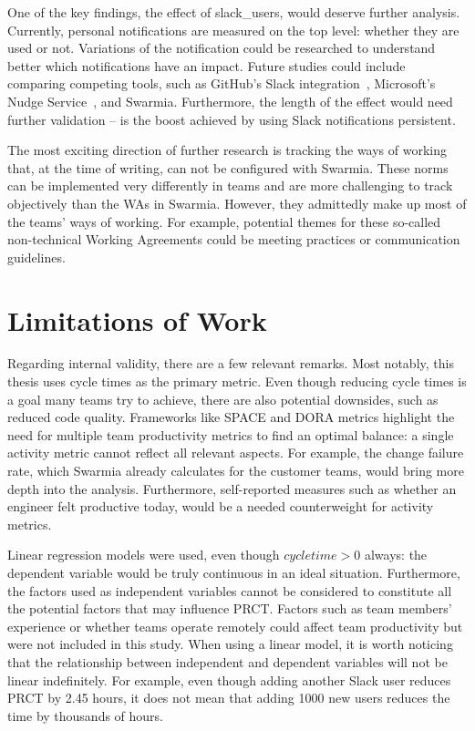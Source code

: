 One of the key findings, the effect of slack\_users, would deserve further analysis. Currently, personal notifications are measured on the top level: whether they are used or not. Variations of the notification could be researched to understand better which notifications have an impact. Future studies could include comparing competing tools, such as GitHub's Slack integration~\cite{slack_technologies_integrationsslack_2022}, Microsoft's Nudge Service~\cite{maddila_nudge_2022}, and Swarmia. Furthermore, the length of the effect would need further validation – is the boost achieved by using Slack notifications persistent.

The most exciting direction of further research is tracking the ways of working that, at the time of writing, can not be configured with Swarmia. These norms can be implemented very differently in teams and are more challenging to track objectively than the WAs in Swarmia. However, they admittedly make up most of the teams' ways of working. For example, potential themes for these so-called non-technical Working Agreements could be meeting practices or communication guidelines.

\section{Limitations of Work}

Regarding internal validity, there are a few relevant remarks. Most notably, this thesis uses cycle times as the primary metric. Even though reducing cycle times is a goal many teams try to achieve, there are also potential downsides, such as reduced code quality. Frameworks like SPACE and DORA metrics highlight the need for multiple team productivity metrics to find an optimal balance: a single activity metric cannot reflect all relevant aspects. For example, the change failure rate, which Swarmia already calculates for the customer teams, would bring more depth into the analysis. Furthermore, self-reported measures such as whether an engineer felt productive today, would be a needed counterweight for activity metrics.  

Linear regression models were used, even though $cycletime > 0$ always: the dependent variable would be truly continuous in an ideal situation. Furthermore, the factors used as independent variables cannot be considered to constitute all the potential factors that may influence PRCT. Factors such as team members' experience or whether teams operate remotely could affect team productivity but were not included in this study. When using a linear model, it is worth noticing that the relationship between independent and dependent variables will not be linear indefinitely. For example, even though adding another Slack user reduces PRCT by 2.45 hours, it does not mean that adding 1000 new users reduces the time by thousands of hours. 

